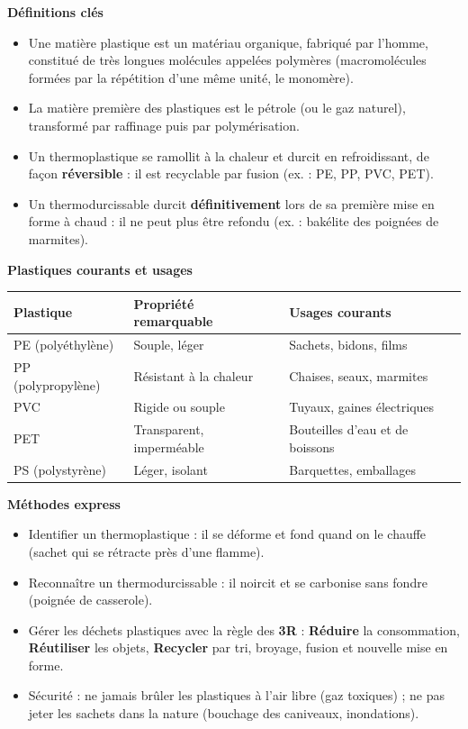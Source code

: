 \documentclass[11pt]{article}
\newcommand{\cle}[1]{{\popxbold\color{popdark}#1}}
\begin{document}
\begin{bilan}
\textbf{Définitions clés}
\begin{itemize}
  \item Une \cle{matière plastique} est un matériau organique, fabriqué par l'homme, constitué de très longues molécules appelées \cle{polymères} (macromolécules formées par la répétition d'une même unité, le \cle{monomère}).
  \item La matière première des plastiques est le \cle{pétrole} (ou le gaz naturel), transformé par raffinage puis par \cle{polymérisation}.
  \item Un \cle{thermoplastique} se ramollit à la chaleur et durcit en refroidissant, de façon \textbf{réversible} : il est recyclable par fusion (ex. : PE, PP, PVC, PET).
  \item Un \cle{thermodurcissable} durcit \textbf{définitivement} lors de sa première mise en forme à chaud : il ne peut plus être refondu (ex. : bakélite des poignées de marmites).
\end{itemize}

\textbf{Plastiques courants et usages}
\begin{center}
\begin{tabularx}{\linewidth}{|l|X|X|}
\hline
\rowcolor{popblueL} \textbf{Plastique} & \textbf{Propriété remarquable} & \textbf{Usages courants} \\
\hline
PE (polyéthylène) & Souple, léger & Sachets, bidons, films \\
\hline
PP (polypropylène) & Résistant à la chaleur & Chaises, seaux, marmites \\
\hline
PVC & Rigide ou souple & Tuyaux, gaines électriques \\
\hline
PET & Transparent, imperméable & Bouteilles d'eau et de boissons \\
\hline
PS (polystyrène) & Léger, isolant & Barquettes, emballages \\
\hline
\end{tabularx}
\end{center}

\textbf{Méthodes express}
\begin{itemize}
  \item \cle{Identifier} un thermoplastique : il se déforme et fond quand on le chauffe (sachet qui se rétracte près d'une flamme).
  \item \cle{Reconnaître} un thermodurcissable : il noircit et se carbonise sans fondre (poignée de casserole).
  \item \cle{Gérer} les déchets plastiques avec la règle des \textbf{3R} : \textbf{Réduire} la consommation, \textbf{Réutiliser} les objets, \textbf{Recycler} par tri, broyage, fusion et nouvelle mise en forme.
  \item \cle{Sécurité} : ne jamais brûler les plastiques à l'air libre (gaz toxiques) ; ne pas jeter les sachets dans la nature (bouchage des caniveaux, inondations).
\end{itemize}
\end{bilan}
\end{document}
